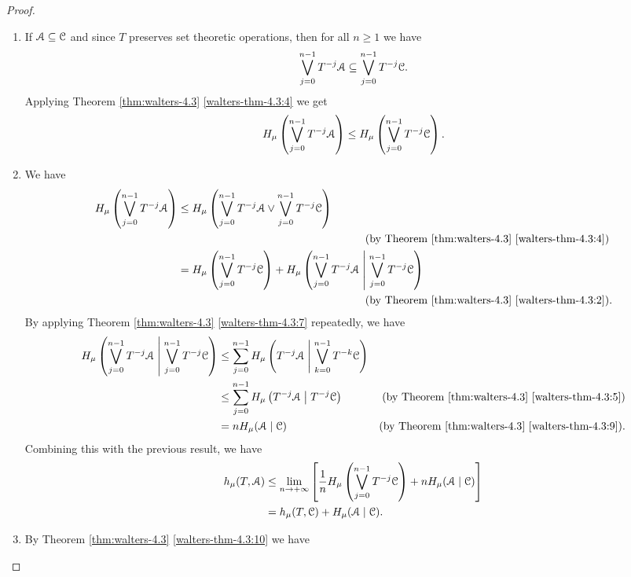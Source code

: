 \begin{theorem}
\begin{proof}
\begin{enumerate}
			\item If $\mathcal{A} \subseteq \mathcal{C}$ and since $T$ preserves set theoretic operations, then for all $n \geq 1$ we have
				\[
					\bigvee_{j = 0}^{n - 1}{T^{-j}{\mathcal{A}}} \subseteq \bigvee_{j = 0}^{n - 1}{T^{-j}{\mathcal{C}}}.
				\]
				Applying Theorem \ref{thm:walters-4.3} \ref{walters-thm-4.3:4} we get
				\[
					H_\mu\left(\bigvee_{j = 0}^{n - 1}{T^{-j}{\mathcal{A}}}\right) \leq H_\mu\left(\bigvee_{j = 0}^{n - 1}{T^{-j}{\mathcal{C}}}\right).
				\]
			\item We have
				\begin{align*}
					H_\mu\left(\bigjoin_{j = 0}^{n - 1}{T^{-j}{\A}}\right) &\leq H_\mu\left(\bigjoin_{j = 0}^{n - 1}{T^{-j}{\A}} \join \bigjoin_{j = 0}^{n - 1}{T^{-j}{\C}}\right) \\ & \hspace{60mm} \text{(by Theorem \ref{thm:walters-4.3} \ref{walters-thm-4.3:4})} \\
						&= H_\mu\left(\bigjoin_{j = 0}^{n - 1}{T^{-j}{\C}}\right) + H_\mu\left(\bigjoin_{j = 0}^{n - 1}{T^{-j}{\A}} \midmid \bigjoin_{j = 0}^{n - 1}{T^{-j}{\C}}\right) \\ & \hspace{60mm} \text{(by Theorem \ref{thm:walters-4.3} \ref{walters-thm-4.3:2}).}
				\end{align*}
				By applying Theorem \ref{thm:walters-4.3} \ref{walters-thm-4.3:7} repeatedly, we have
				\begin{align*}
					H_\mu\left(\bigvee_{j = 0}^{n - 1}{T^{-j}{\mathcal{A}}} \mathrel{}\middle|\mathrel{} \bigvee_{j = 0}^{n - 1}{T^{-j}{\mathcal{C}}}\right) &\leq \sum_{j = 0}^{n - 1}{H_\mu\left(T^{-j}{\mathcal{A}} \mathrel{}\middle|\mathrel{} \bigvee_{k = 0}^{n - 1}{T^{-k}{\mathcal{C}}}\right)} \\
						&\leq \sum_{j = 0}^{n - 1}{H_\mu\left(T^{-j}{\mathcal{A}} \mathrel{}\middle|\mathrel{} T^{-j}{\mathcal{C}}\right)} & \text{(by Theorem \ref{thm:walters-4.3} \ref{walters-thm-4.3:5})} \\
						&= nH_\mu(\mathcal{A} \mid \mathcal{C}) & \text{(by Theorem \ref{thm:walters-4.3} \ref{walters-thm-4.3:9}).}
				\end{align*}
				Combining this with the previous result, we have
				\begin{align*}
					h_\mu(T, \mathcal{A}) &\leq \lim_{n \to +\infty}{\left[\frac{1}{n} H_\mu\left(\bigvee_{j = 0}^{n - 1}{T^{-j}{\mathcal{C}}}\right) + nH_\mu(\mathcal{A} \mid \mathcal{C})\right]} \\
						&= h_\mu(T, \mathcal{C}) + H_\mu(\mathcal{A} \mid \mathcal{C}).
				\end{align*}
			\item By Theorem \ref{thm:walters-4.3} \ref{walters-thm-4.3:10} we have

\end{enumerate}
\end{proof}
\end{theorem}
